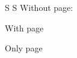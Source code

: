 \documentclass[a5paper]{article}
\begin{document}
\beginnumbering
\pstart
S
\pend
\pstart[\newpage]
S
\pend
\endnumbering
Without page: 

With page 

Only page  
\end{document}
